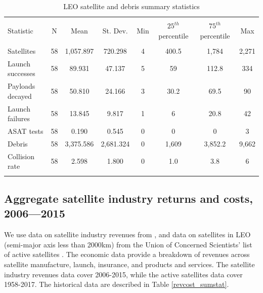 \documentclass[12pt]{article}
\begin{document}
\begin{table}[!htbp] \centering 
	\caption[LEO satellite and debris summary statistics]{LEO satellite and debris summary statistics} 
	\label{physstock_sumstat} 
	\hspace*{-1cm}
	\begin{tabular}{@{\extracolsep{5pt}}lccccccc} 
		\\[-1.8ex]\hline 
		\hline \\[-1.8ex] 
		Statistic & \multicolumn{1}{c}{N} & \multicolumn{1}{c}{Mean} & \multicolumn{1}{c}{St. Dev.} & \multicolumn{1}{c}{Min} & \multicolumn{1}{c}{$25^{th}$ percentile} & \multicolumn{1}{c}{$75^{th}$ percentile} & \multicolumn{1}{c}{Max} \\ 
		\hline \\[-1.8ex] 
		Satellites & 58 & 1,057.897 & 720.298 & 4 & 400.5 & 1,784 & 2,271 \\ 
		Launch successes & 58 & 89.931 & 47.137 & 5 & 59 & 112.8 & 334 \\ 
		Payloads decayed & 58 & 50.810 & 24.166 & 3 & 30.2 & 69.5 & 90 \\ 
		Launch failures & 58 & 13.845 & 9.817 & 1 & 6 & 20.8 & 42 \\ 
		ASAT tests & 58 & 0.190 & 0.545 & 0 & 0 & 0 & 3 \\ 
		Debris & 58 & 3,375.586 & 2,681.324 & 0 & 1,609 & 3,852.2 & 9,662 \\ 
		Collision rate & 58 & 2.598 & 1.800 & 0 & 1.0 & 3.8 & 6 \\ 
		\hline \\[-1.8ex] 
	\end{tabular} 
\end{table} 


\subsection{Aggregate satellite industry returns and costs, 2006---2015}

We use data on satellite industry revenues from \citet{wienzierl2018}, and data on satellites in LEO (semi-major axis less than 2000km) from the Union of Concerned Scientists' list of active satellites \citep{UCSdata}. The economic data provide a breakdown of revenues across satellite manufacture, launch, insurance, and products and services. The satellite industry revenues data cover 2006-2015, while the active satellites data cover 1958-2017. The historical data are described in Table \ref{revcost_sumstat}. \\
\end{document}
